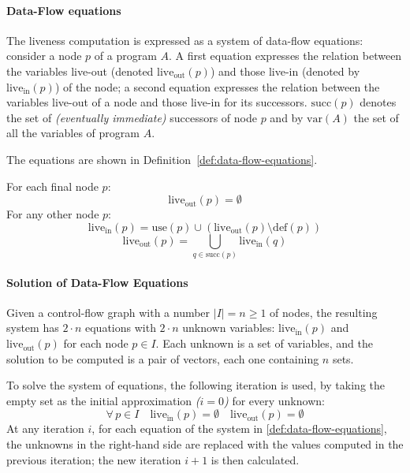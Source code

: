 \documentclass[english]{article}
\begin{document}
\paragraph{Data-Flow equations}

The liveness computation is expressed as a system of data-flow equations:
consider a node \(p\) of a program \(A\).
A first equation expresses the relation between the variables live-out (denoted \(\text{live}_\text{out}\left( p \right)\)) and those live-in (denoted by \(\text{live}_\text{in}\left( p \right)\)) of the node;
a second equation expresses the relation between the variables live-out of a node and those live-in for its successors.
\(\text{succ}\left( p \right)\) denotes the set of \textit{(eventually immediate)} successors of node \(p\) and by \(\text{var}(A)\) the set of all the variables of program \(A\).

The equations are shown in Definition~\ref{def:data-flow-equations}.

\begin{definition}
  \label{def:data-flow-equations}
  For each final node \(p\):
  \[ \text{live}_\text{out}\left( p \right) = \emptyset \]
  For any other node \(p\):
  \[ \text{live}_\text{in}\left( p \right) = \text{use}\left( p \right) \cup \left( \text{live}_\text{out} \left( p \right) \setminus \text{def}\left( p \right) \right) \]
  \[ \text{live}_\text{out}\left( p \right) = \bigcup_{q \in \text{succ}\left( p \right)} \text{live}_\text{in}\left( q \right) \]
\end{definition}

\paragraph{Solution of Data-Flow Equations}

Given a control-flow graph with a number \(|I| = n \geq 1\) of nodes, the resulting system has \(2 \cdot n\) equations with \(2 \cdot n\) unknown variables: \(\text{live}_\text{in}\left( p \right)\) and \(\text{live}_\text{out}\left( p \right)\) for each node \(p \in I\).
Each unknown is a set of variables, and the solution to be computed is a pair of vectors, each one containing \(n\) sets.

To solve the system of equations, the following iteration is used, by taking the empty set as the initial approximation \textit{(\(i=0\))} for every unknown:
\[ \forall \, p \in I \quad \text{live}_\text{in}\left( p \right) = \emptyset \quad \text{live}_\text{out} \left( p \right) = \emptyset \]
At any iteration \(i\), for each equation of the system in \ref{def:data-flow-equations}, the unknowns in the right-hand side are replaced with the values computed in the previous iteration;
the new iteration \(i + 1\) is then calculated.
\end{document}
